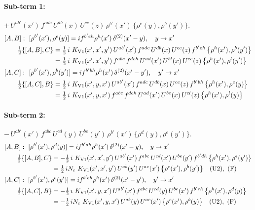 \documentclass[10pt]{article}
\numberwithin{equation}{section}
\begin{document}
\paragraph{Sub-term 1:} $+\,U^{ab'}(x')\,f^{adc}\,U^{db}(x)\,U^{ce}(z)\,\rho^{b'}(x')\,\big\{\rho^{e}(y),\rho^{b}(y')\big\}$.
\begin{align}
&[A,B]:\ [\rho^{b'}(x'),\rho^{e}(y)]=i f^{b'eh}\rho^{h}(x')\,\delta^{(2)}(x'-y),\quad y\to x'\notag\\
&\qquad \tfrac12\{[A,B],C\}=\tfrac12\,i\,\,K_{\rm V1}(x',x',y')\,U^{ab'}(x')\,f^{adc}\,U^{db}(x)\,U^{ce}(z)\,f^{b'eh}\,\big\{\rho^{h}(x'),\rho^{b}(y')\big\}\notag\\
&\qquad\phantom{\tfrac12\{[A,B],C\}}=\tfrac12\,i\,\,K_{\rm V1}(x',x',y')\,f^{abc}\,f^{deh}\,U^{ad}(x')\,U^{bl}(x)\,U^{ce}(z)\,\big\{\rho^{h}(x'),\rho^{l}(y')\big\}
\label{R:eq:GI.V1-1-AB}\\
&[A,C]:\ [\rho^{b'}(x'),\rho^{b}(y')]=i f^{b'bh}\rho^{h}(x')\,\delta^{(2)}(x'-y'),\quad y'\to x'\notag\\
&\qquad \tfrac12\{[A,C],B\}=\tfrac12\,i\,\,K_{\rm V1}(x',y,x')\,U^{ab'}(x')\,f^{adc}\,U^{db}(x)\,U^{ce}(z)\,f^{b'bh}\,\big\{\rho^{h}(x'),\rho^{e}(y)\big\}\notag\\
&\qquad\phantom{\tfrac12\{[A,C],B\}}=\tfrac12\,i\,\,K_{\rm V1}(x',y,x')\,f^{abc}\,f^{deh}\,U^{ad}(x')\,U^{be}(x)\,U^{cl}(z)\,\big\{\rho^{h}(x'),\rho^{l}(y)\big\}
\label{R:eq:GI.V1-1-AC}
\end{align}
\paragraph{Sub-term 2:} $-\,U^{ab'}(x')\,f^{abc}\,U^{cd}(y)\,U^{be}(y')\,\rho^{b'}(x')\,\big\{\rho^{d}(y),\rho^{e}(y')\big\}$.
\begin{align}
&[A,B]:\ [\rho^{b'}(x'),\rho^{d}(y)]=i f^{b'dh}\rho^{h}(x')\,\delta^{(2)}(x'-y),\quad y\to x'\notag\\
&\qquad \tfrac12\{[A,B],C\}=-\tfrac12\,i\,\,K_{\rm V1}(x',x',y')\,U^{ab'}(x')\,f^{abc}\,U^{cd}(x')\,U^{be}(y')\,f^{b'dh}\,\big\{\rho^{h}(x'),\rho^{e}(y')\big\}\notag\\
&\qquad\phantom{\tfrac12\{[A,B],C\}}=\tfrac12\,i N_{c}\,\,K_{\rm V1}(x',x',y')\,U^{ab}(y')\,U^{ac}(x')\,\big\{\rho^{c}(x'),\rho^{b}(y')\big\}\quad\text{(U2)},\ \text{(F)}
\label{R:eq:GI.V1-2-AB}\\
&[A,C]:\ [\rho^{b'}(x'),\rho^{e}(y')]=i f^{b'eh}\rho^{h}(x')\,\delta^{(2)}(x'-y'),\quad y'\to x'\notag\\
&\qquad \tfrac12\{[A,C],B\}=-\tfrac12\,i\,\,K_{\rm V1}(x',y,x')\,U^{ab'}(x')\,f^{abc}\,U^{cd}(y)\,U^{be}(x')\,f^{b'eh}\,\big\{\rho^{h}(x'),\rho^{d}(y)\big\}\notag\\
&\qquad\phantom{\tfrac12\{[A,C],B\}}=-\tfrac12\,i N_{c}\,\,K_{\rm V1}(x',y,x')\,U^{ab}(y)\,U^{ac}(x')\,\big\{\rho^{c}(x'),\rho^{b}(y)\big\}\quad\text{(U2)},\ \text{(F)}
\label{R:eq:GI.V1-2-AC}
\end{align}
\end{document}
